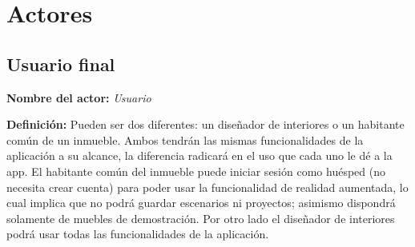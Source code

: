 \section{Actores}

\subsection{Usuario final}
\textbf{Nombre del actor:} \textit{Usuario}\par
\textbf{Definición:} Pueden ser dos diferentes: un diseñador de interiores o un habitante común de un inmueble. Ambos tendrán las mismas funcionalidades de la aplicación a su alcance, la diferencia radicará en el uso que cada uno le dé a la app. El habitante común del inmueble puede iniciar sesión como huésped (no necesita crear cuenta) para poder usar la funcionalidad de realidad aumentada, lo cual implica que no podrá guardar escenarios ni proyectos; asimismo dispondrá solamente de muebles de demostración. Por otro lado el diseñador de interiores podrá usar todas las funcionalidades de la aplicación.